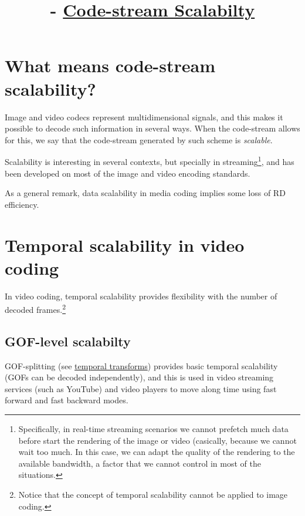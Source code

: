 



\title{\SM{} -  \href{https://github.com/Sistemas-Multimedia/Sistemas-Multimedia.github.io/tree/master/contents/data_scalability}{Code-stream Scalabilty}}

\maketitle
\tableofcontents

\section{What means code-stream scalability?}

Image and video codecs represent multidimensional signals, and this
makes it possible to decode such information in several ways. When the
code-stream allows for this, we say that the code-stream generated by such
scheme is \emph{scalable}.

Scalability is interesting in several contexts, but specially in
streaming\footnote{Specifically, in real-time streaming scenarios we
  cannot prefetch much data before start the rendering of the image or
  video (casically, because we cannot wait too much. In this case, we
  can adapt the quality of the rendering to the available bandwidth, a
  factor that we cannot control in most of the situations.}, and has
been developed on most of the image and video encoding standards.

As a general remark, data scalability in media coding implies some
loss of RD efficiency.


\section{Temporal scalability in video coding~\cite{vruiz__video_scalability}}


In video coding, temporal scalability provides flexibility with the
number of decoded frames.\footnote{Notice that the concept of temporal
scalability cannot be applied to image coding.}

\subsection{GOF-level scalabilty}
GOF-splitting (see
\href{https://sistemas-multimedia.github.io/contents/temporal_transforms/}{temporal
  transforms}) provides basic temporal scalability (GOFs can be
decoded independently), and this is used in video streaming services
(such as YouTube) and video players to move along time using fast
forward and fast backward modes.
  
